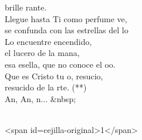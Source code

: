 \begin{cancion}
\begin{chorus}
	brille rante.\\
	Llegue hasta Ti como perfume ve,\\
	se confunda con las estrellas del lo\\
Lo encuentre encendido,\\
	el lucero de la mana,\\
	esa esella, que no conoce el oo.\\
\jump
	Que es Cristo tu o, resucio,\\
	resucido de la rte. (**)\\
	An, An, n... &nbsp; \\
	\end{chorus}%
	\jump\\
<span id=cejilla-original>1</span>\\
\end{cancion}%
